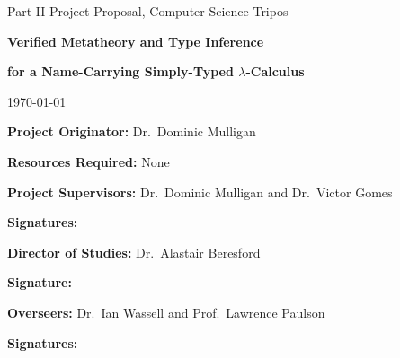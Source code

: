 \begin{titlepage}

\medskip
{}
\medskip
{}

\vfil

\centerline{\large Part II Project Proposal, Computer Science Tripos}
\vspace{0.4in}
\centerline{\Large\bf Verified Metatheory and Type Inference}
\centerline{\Large\bf for a Name-Carrying Simply-Typed \(\lambda\)-Calculus}
\vspace{0.3in}
\centerline{\large \today}

\vfil

{\bf Project Originator:} Dr.~Dominic Mulligan

\vspace{0.1in}

{\bf Resources Required:} None

\vspace{0.5in}

{\bf Project Supervisors:} Dr.~Dominic Mulligan and Dr.~Victor Gomes

\vspace{0.2in}

{\bf Signatures:}

\vspace{0.5in}

{\bf Director of Studies:} Dr.~Alastair Beresford

\vspace{0.2in}

{\bf Signature:}

\vspace{0.5in}

{\bf Overseers:} Dr.~Ian Wassell and Prof.~Lawrence Paulson

\vspace{0.2in}

{\bf Signatures:}

\vfil
\end{titlepage}
